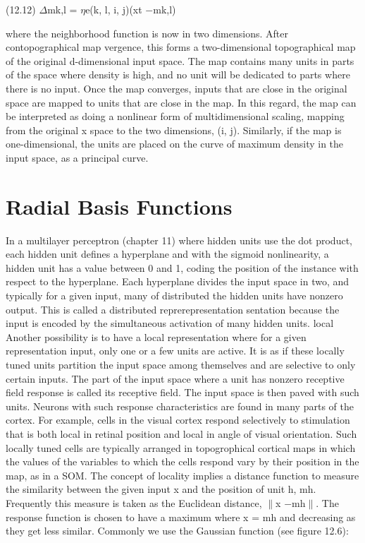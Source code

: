 (12.12) $\Delta$mk,l = $\eta$e(k, l, i, j)(xt $-$mk,l)

where the neighborhood function is now in two dimensions. After contopographical map vergence, this forms a two-dimensional topographical map of the original d-dimensional input space. The map contains many units in parts of the space where density is high, and no unit will be dedicated to parts where there is no input. Once the map converges, inputs that are close in the original space are mapped to units that are close in the map. In this regard, the map can be interpreted as doing a nonlinear form of multidimensional scaling, mapping from the original x space to the two dimensions, (i, j). Similarly, if the map is one-dimensional, the units are placed on the curve of maximum density in the input space, as a principal curve.

\section{Radial Basis Functions}

In a multilayer perceptron (chapter 11) where hidden units use the dot product, each hidden unit defines a hyperplane and with the sigmoid nonlinearity, a hidden unit has a value between 0 and 1, coding the position of the instance with respect to the hyperplane. Each hyperplane divides the input space in two, and typically for a given input, many of distributed the hidden units have nonzero output. This is called a distributed reprerepresentation sentation because the input is encoded by the simultaneous activation of many hidden units. local Another possibility is to have a local representation where for a given representation input, only one or a few units are active. It is as if these locally tuned units partition the input space among themselves and are selective to only certain inputs. The part of the input space where a unit has nonzero receptive field response is called its receptive field. The input space is then paved with such units. Neurons with such response characteristics are found in many parts of the cortex. For example, cells in the visual cortex respond selectively to stimulation that is both local in retinal position and local in angle of visual orientation. Such locally tuned cells are typically arranged in topogrophical cortical maps in which the values of the variables to which the cells respond vary by their position in the map, as in a SOM. The concept of locality implies a distance function to measure the similarity between the given input x and the position of unit h, mh. Frequently this measure is taken as the Euclidean distance, $\parallel$x $-$mh$\parallel$. The response function is chosen to have a maximum where x = mh and decreasing as they get less similar. Commonly we use the Gaussian function (see figure 12.6):

